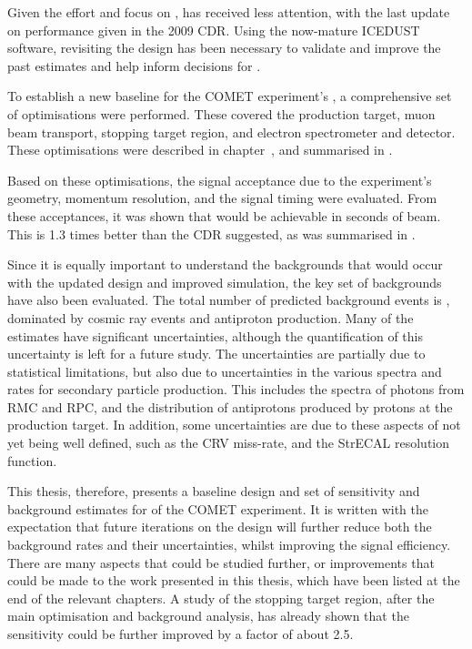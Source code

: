 Given the effort and focus on \phaseI,  \phaseII has received less attention, with the last update on performance given in the 2009 CDR.
Using the now-mature ICEDUST software, revisiting the \phaseII design has been necessary to validate and improve the past estimates and help inform decisions for \phaseI.

To establish a new baseline for the COMET experiment's \phaseII, a comprehensive set of optimisations were performed.
These covered the production target, muon beam transport, stopping target region, and electron spectrometer and detector.
These optimisations were described in chapter~, and summarised in .

Based on these optimisations, the signal acceptance due to the experiment's geometry, momentum resolution, and the signal timing were evaluated.
From these acceptances, it was shown that \VarPredictedSES would be achievable in \VarRunTime seconds of beam.
This is 1.3 times better than the \phaseII CDR suggested, as was summarised in .

Since it is equally important to understand the backgrounds that would occur with the updated design and improved simulation, 
the key set of backgrounds have also been evaluated.
The total number of predicted background events is \VarTotalBgPhasII, dominated by cosmic ray events and antiproton production.
Many of the estimates have significant uncertainties, although the quantification of this uncertainty is left for a future study.
The uncertainties are partially due to statistical limitations, but also due to uncertainties in the various spectra and rates for secondary particle production.
This includes the spectra of photons from \acl{RMC} and \acl{RPC}, and the distribution of antiprotons produced by protons at the production target.
In addition, some uncertainties are due to these aspects of \phaseII not yet being well defined, such as the \ac{CRV} miss-rate, and the StrECAL resolution function.

This thesis, therefore, presents a baseline design and set of sensitivity and background estimates for \phaseII of the COMET experiment.
It is written with the expectation that future iterations on the design will further reduce both the background rates and their uncertainties, whilst improving the signal efficiency.
There are many aspects that could be studied further, or improvements that could be made to the work presented in this thesis, which have been listed at the end of the relevant chapters.
A study of the stopping target region, after the main optimisation and background analysis, has already shown that the sensitivity could be further improved by a factor of about 2.5.


